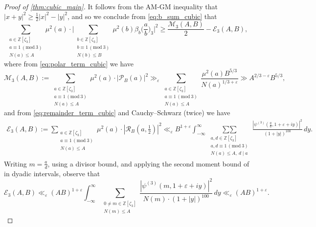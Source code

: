 \documentclass[12pt,reqno]{amsart}
\numberwithin{equation}{section}
\renewcommand{\pmod}[1]{\, (\mathrm{mod}\ #1)}
\newcommand{\sumtwo}{\operatorname*{\sum\sum}}
\begin{document}
\begin{proof}[Proof of \cref{thm:cubic_main}]
   It follows from the AM-GM inequality that $|{x+y}|^2 \geq \frac{1}{2}|{x}|^2 - |{y}|^2$, and so we conclude from \eqref{eq:b_sum_cubic} that
    \begin{equation} \label{eq:AMGM_cubic}
        \sum_{\substack{ a \in \mathbb{Z}[\zeta_3] \\ a \equiv 1 \pmod{3} \\ N(a) \leq A}} \mu^2(a) \cdot \Bigg | \sum_{\substack{ b \in \mathbb{Z}[\zeta_3] \\ b \equiv 1 \pmod{3} \\ N(b) \leq B }} \mu^2(b) \beta_b \Big(\frac{a}{b}\Big)_3  \Bigg |^2 \geq \frac{\mathcal{M}_3(A, B)}{2} - \mathcal{E}_3(A, B),
    \end{equation}
    where from \eqref{eq:polar_term_cubic} we have  
    \begin{equation} \label{eq:Mdef_cubic}
        \mathcal{M}_3(A, B):= \sum_{\substack{ a \in \mathbb{Z}[\zeta_3] \\ a \equiv 1 \pmod{3} \\ N(a) \leq A}} \mu^2(a) \cdot |{\mathcal{P}_B(a)}|^2 \gg_\varepsilon \sum_{\substack{ a \in \mathbb{Z}[\zeta_3] \\ a \equiv 1 \pmod{3} \\ N(a) \leq A}} \frac{\mu^2(a) B^{5/3}}{N(a)^{1/3+\varepsilon}} \gg A^{2/3 - \varepsilon} B^{5/3},
    \end{equation}
    and from \eqref{eq:remainder_term_cubic} and Cauchy--Schwarz (twice) we have
    \begin{align*}
        \mathcal{E}_3(A, B) := \sum_{\substack{ a \in \mathbb{Z}[\zeta_3] \\ a \equiv 1 \pmod{3} \\ N(a) \leq A}} \mu^2(a) \cdot |{\mathcal{R}_B(a, \tfrac{1}{2})}|^2 \ll_\varepsilon B^{1+\varepsilon} \int_{-\infty}^\infty \sumtwo_{\substack{ a, d \in \mathbb{Z}[\zeta_3] \\ a, d \equiv 1 \pmod{3} \\ N(a) \leq A, \ d \mid a}} \frac{|\psi^{(3)}(\frac{a}{d}, 1+\varepsilon +iy)|^2}{(1+|y|)^{100}} \, dy.
    \end{align*}
    Writing $m = \frac{a}{d}$, using a divisor bound, and applying the second moment bound of \cite[Lemma 6.6]{DDDS24} in dyadic intervals, observe that
    \begin{equation}\label{eq:E_bound_cubic}
        \mathcal{E}_3(A, B) \ll_\varepsilon (AB)^{1+\varepsilon} \int_{-\infty}^\infty \sum_{\substack{0 \neq m \in \mathbb{Z}[\zeta_3] \\ N(m) \leq A}} \frac{|\psi^{(3)}(m, 1+\varepsilon +iy)|^2}{N(m) \cdot (1+|y|)^{100}} \, dy \ll_\varepsilon (AB)^{1+\varepsilon}.
    \end{equation}


\end{proof}
\end{document}

